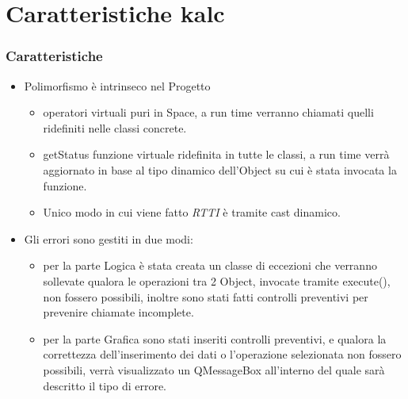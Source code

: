 \documentclass[10pt]{beamer}
\begin{document}
\section{Caratteristiche kalc}
\begin{frame}
\frametitle{Caratteristiche}
\begin{itemize}
\item Polimorfismo è intrinseco nel Progetto
\begin{itemize}
\item operatori virtuali puri in Space, a run time verranno chiamati quelli ridefiniti nelle classi concrete.
\item getStatus funzione virtuale ridefinita in tutte le classi, a run time verrà aggiornato in base al tipo dinamico dell'Object su cui è stata invocata la funzione.
\item Unico modo in cui viene fatto \textit{RTTI} è tramite cast dinamico.

\end{itemize}

\item Gli errori sono gestiti in due modi:
\begin{itemize}
\item per la parte Logica è stata creata un classe di eccezioni che verranno sollevate qualora le operazioni tra 2 Object, invocate tramite execute(), non fossero possibili, inoltre sono stati fatti controlli preventivi per prevenire chiamate incomplete.
\item per la parte Grafica sono stati inseriti controlli preventivi, e qualora la correttezza dell'inserimento dei dati o l'operazione selezionata non fossero possibili, verrà visualizzato un QMessageBox all'interno del quale sarà descritto il tipo di errore. 

\end{itemize}

\end{itemize}
\end{frame}

\end{document}
